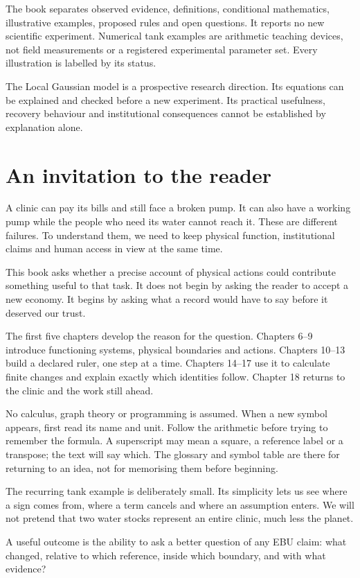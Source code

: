 \documentclass[11pt,twoside,openany]{book}
\begin{document}
The book separates observed evidence, definitions, conditional mathematics, illustrative examples, proposed rules and open questions. It reports no new scientific experiment. Numerical tank examples are arithmetic teaching devices, not field measurements or a registered experimental parameter set. Every illustration is labelled by its status.

The Local Gaussian model is a prospective research direction. Its equations can be explained and checked before a new experiment. Its practical usefulness, recovery behaviour and institutional consequences cannot be established by explanation alone.
\chapter*{An invitation to the reader}
A clinic can pay its bills and still face a broken pump. It can also have a working pump while the people who need its water cannot reach it. These are different failures. To understand them, we need to keep physical function, institutional claims and human access in view at the same time.

This book asks whether a precise account of physical actions could contribute something useful to that task. It does not begin by asking the reader to accept a new economy. It begins by asking what a record would have to say before it deserved our trust.

The first five chapters develop the reason for the question. Chapters 6--9 introduce functioning systems, physical boundaries and actions. Chapters 10--13 build a declared ruler, one step at a time. Chapters 14--17 use it to calculate finite changes and explain exactly which identities follow. Chapter 18 returns to the clinic and the work still ahead.

No calculus, graph theory or programming is assumed. When a new symbol appears, first read its name and unit. Follow the arithmetic before trying to remember the formula. A superscript may mean a square, a reference label or a transpose; the text will say which. The glossary and symbol table are there for returning to an idea, not for memorising them before beginning.

The recurring tank example is deliberately small. Its simplicity lets us see where a sign comes from, where a term cancels and where an assumption enters. We will not pretend that two water stocks represent an entire clinic, much less the planet.

A useful outcome is the ability to ask a better question of any EBU claim: what changed, relative to which reference, inside which boundary, and with what evidence?
\tableofcontents
\mainmatter


















\backmatter


\end{document}
